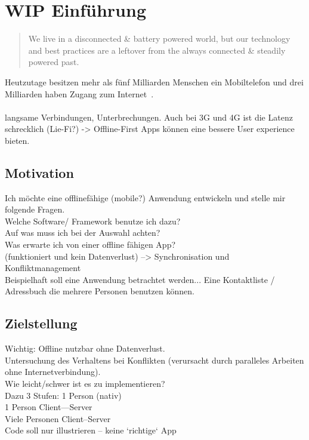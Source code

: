 \chapter{\label{chap:einleitung}WIP Einführung}
\begin{quote}
	We live in a disconnected \& battery powered world, but our technology and best practices are a leftover from the always connected \& steadily powered past.
	\cite{offlinefirst}
\end{quote}

Heutzutage besitzen mehr als fünf Milliarden Menschen ein Mobiltelefon und drei Milliarden haben Zugang zum Internet~\cite{dev-report}.\\\\
langsame Verbindungen, Unterbrechungen. Auch bei 3G und 4G ist die Latenz schrecklich (Lie-Fi?) -> Offline-First Apps können eine bessere User experience bieten.

\section{Motivation}
Ich möchte eine offlinefähige (mobile?) Anwendung entwickeln und stelle mir folgende Fragen. \\
Welche Software/ Framework benutze ich dazu?\\
Auf was muss ich bei der Auswahl achten?\\
Was erwarte ich von einer offline fähigen App?\\
(funktioniert und kein Datenverlust) --> Synchronisation und Konfliktmanagement\\
Beispielhaft soll eine Anwendung betrachtet werden... Eine Kontaktliste / Adressbuch die mehrere Personen benutzen können.\\
\section{Zielstellung}
Wichtig: Offline nutzbar ohne Datenverlust.\\
Untersuchung des Verhaltens bei  Konflikten (verursacht durch paralleles Arbeiten ohne Internetverbindung).\\
Wie leicht/schwer ist es zu implementieren?
\\
Dazu 3 Stufen: 1 Person (nativ)\\
1 Person Client---Server\\
Viele Personen Client--Server\\
Code soll nur illustrieren -- keine `richtige` App
